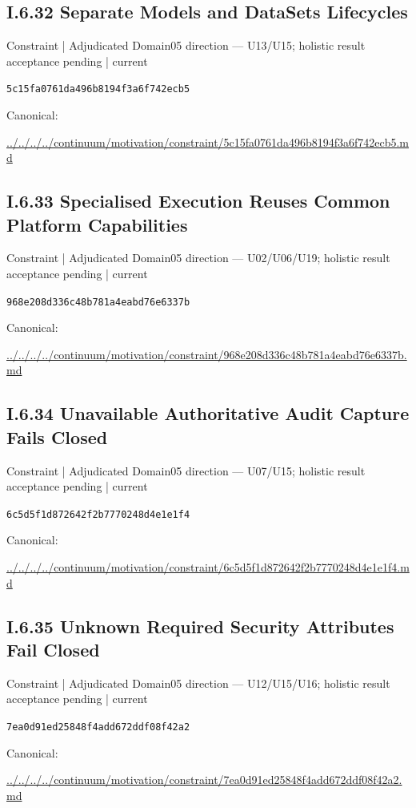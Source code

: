 \documentclass[10pt,a4paper]{article}
\begin{document}
\subsection*{I.6.32 Separate Models and DataSets Lifecycles}
{\small Constraint | Adjudicated Domain05 direction — U13/U15; holistic result acceptance pending | current}\par
\texttt{5c15fa0761da496b8194f3a6f742ecb5}\par
Canonical: \par
{\footnotesize\url{../../../../continuum/motivation/constraint/5c15fa0761da496b8194f3a6f742ecb5.md}}\par
\subsection*{I.6.33 Specialised Execution Reuses Common Platform Capabilities}
{\small Constraint | Adjudicated Domain05 direction — U02/U06/U19; holistic result acceptance pending | current}\par
\texttt{968e208d336c48b781a4eabd76e6337b}\par
Canonical: \par
{\footnotesize\url{../../../../continuum/motivation/constraint/968e208d336c48b781a4eabd76e6337b.md}}\par
\subsection*{I.6.34 Unavailable Authoritative Audit Capture Fails Closed}
{\small Constraint | Adjudicated Domain05 direction — U07/U15; holistic result acceptance pending | current}\par
\texttt{6c5d5f1d872642f2b7770248d4e1e1f4}\par
Canonical: \par
{\footnotesize\url{../../../../continuum/motivation/constraint/6c5d5f1d872642f2b7770248d4e1e1f4.md}}\par
\subsection*{I.6.35 Unknown Required Security Attributes Fail Closed}
{\small Constraint | Adjudicated Domain05 direction — U12/U15/U16; holistic result acceptance pending | current}\par
\texttt{7ea0d91ed25848f4add672ddf08f42a2}\par
Canonical: \par
{\footnotesize\url{../../../../continuum/motivation/constraint/7ea0d91ed25848f4add672ddf08f42a2.md}}\par
\end{document}
